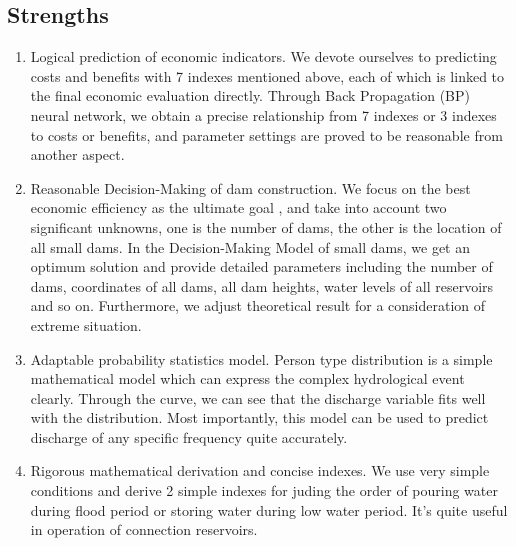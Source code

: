 \documentclass[12pt]{article}%
\begin{document}
\subsection{Strengths}
		\begin{enumerate}[1.]
		\item Logical prediction of economic indicators. We devote ourselves to predicting costs and benefits with 7 indexes mentioned above, each of which is linked to the final economic evaluation directly. Through Back Propagation (BP) neural network, we obtain a precise relationship from 7 indexes or 3 indexes to costs or benefits, and parameter settings are proved to be reasonable from another aspect.
		\item Reasonable Decision-Making of dam construction. We focus on the best economic efficiency as the ultimate goal , and take into account two significant unknowns, one is the number of dams, the other is the location of all small dams. In the Decision-Making Model of small dams, we get an optimum solution and provide detailed parameters including the number of dams, coordinates of all dams, all dam heights, water levels of all reservoirs and so on. Furthermore, we adjust theoretical result for a consideration of extreme situation.
		\item Adaptable probability statistics model. Person type \uppercase\expandafter{} distribution is a simple mathematical model which can express the complex hydrological event clearly. Through the curve, we can see that the discharge variable fits well with the distribution. Most importantly, this model can be used to predict discharge of any specific frequency quite accurately.
		\item Rigorous mathematical derivation and concise indexes. We use very simple conditions and derive 2 simple indexes for juding the order of pouring water during flood period or storing water during low water period. It's quite useful in operation of connection reservoirs.
		\end{enumerate}
\end{document}
